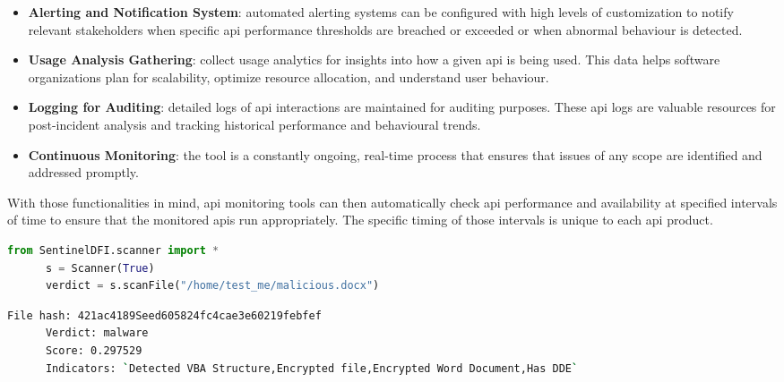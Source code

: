 \begin{multicols}{2}
\begin{itemize}
            \item \textbf{Alerting and Notification System}: automated alerting systems can be configured with high levels of
                  customization to notify relevant stakeholders when specific \acrshort{api} performance thresholds are breached
                  or exceeded or when abnormal behaviour is detected.
            \item \textbf{Usage Analysis Gathering}: collect usage analytics for insights into how a given \acrshort{api} is
                  being used. This data helps software organizations plan for scalability, optimize resource allocation, and
                  understand user behaviour.
            \item \textbf{Logging for Auditing}: detailed logs of \acrshort{api} interactions are maintained for auditing
                  purposes. These \acrshort{api} logs are valuable resources for post-incident analysis and tracking historical
                  performance and behavioural trends.
            \item \textbf{Continuous Monitoring}: the tool is a constantly ongoing, real-time process that ensures that
                  issues of any scope are identified and addressed promptly.
      \end{itemize}
      With those functionalities in mind, \acrshort{api} monitoring tools can then automatically check \acrshort{api}
      performance and availability at specified intervals of time to ensure that the monitored \acrshort{api}s run
      appropriately. The specific timing of those intervals is unique to each \acrshort{api} product.

\end{multicols}

\begin{lstlisting}[language=Python, caption=SentinelOne SDK implementation]
      from SentinelDFI.scanner import *
      s = Scanner(True)
      verdict = s.scanFile("/home/test_me/malicious.docx")
\end{lstlisting}

\begin{lstlisting}[language=bash]
      File hash: 421ac4189Seed605824fc4cae3e60219febfef
      Verdict: malware
      Score: 0.297529
      Indicators: `Detected VBA Structure,Encrypted file,Encrypted Word Document,Has DDE`
\end{lstlisting}

